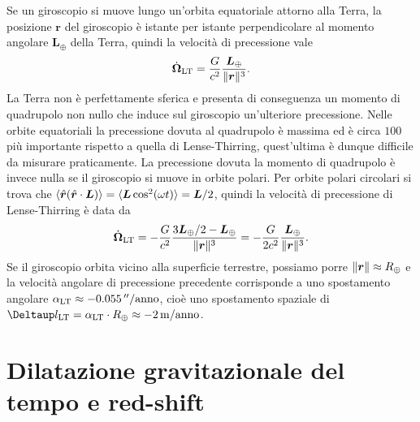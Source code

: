 Se un giroscopio si muove lungo un'orbita equatoriale attorno alla Terra, la
posizione $\bm{r}$ del giroscopio è istante per istante perpendicolare al
momento angolare $\bm{L}_{\oplus}$ della Terra, quindi la velocità di
precessione vale
\begin{equation}
  \dot{\bm{\Omega}}_{\textup{LT}} = \frac{G}{c^{2}}
  \frac{\bm{L}_{\oplus}}{\lVert\bm{r}\rVert^{3}}.
\end{equation}
La Terra non è perfettamente sferica e presenta di conseguenza un momento di
quadrupolo non nullo che induce sul giroscopio un'ulteriore precessione.  Nelle
orbite equatoriali la precessione dovuta al quadrupolo è massima ed è circa
$100$ più importante rispetto a quella di Lense-Thirring, quest'ultima è dunque
difficile da misurare praticamente.  La precessione dovuta la momento di
quadrupolo è invece nulla se il giroscopio si muove in orbite polari.  Per
orbite polari circolari si trova che
$\langle \hat{\bm{r}}(\hat{\bm{r}} \cdot \bm{L})\rangle = \langle \bm{L}
\cos^{2}(\omega t)\rangle = \bm{L}/2$,
quindi la velocità di precessione di Lense-Thirring è data da
\begin{equation}
  \dot{\bm{\Omega}}_{\textup{LT}} = -\frac{G}{c^{2}} \frac{3\bm{L}_{\oplus}/2 -
    \bm{L}_{\oplus}}{\lVert\bm{r}\rVert^{3}} = -\frac{G}{2c^{2}}
  \frac{\bm{L}_{\oplus}}{\lVert\bm{r}\rVert^{3}}.
\end{equation}
Se il giroscopio orbita vicino alla superficie terrestre, possiamo porre
$\lVert\bm{r}\rVert \approx R_{\oplus}$ e la velocità angolare di precessione
precedente corrisponde a uno spostamento angolare
$\alpha_{\textup{LT}} \approx -\SI{0.055}{\arcsecond/anno}$, cioè uno
spostamento spaziale di
$\var l_{\textup{LT}} = \alpha_{\textup{LT}} \cdot R_{\oplus} \approx
-\SI{2}{\metre/anno}$.

\section{Dilatazione gravitazionale del tempo e red-shift}
\label{sec:red-shift-gravitazionale}


